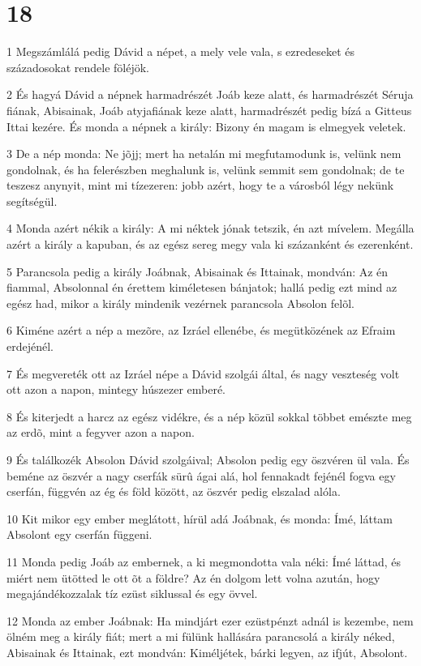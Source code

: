 \chapter{18}

\par 1 Megszámlálá pedig Dávid a népet, a mely vele vala, s ezredeseket és századosokat rendele föléjök.
\par 2 És hagyá Dávid a népnek harmadrészét Joáb keze alatt, és harmadrészét Séruja fiának,  Abisainak, Joáb atyjafiának keze alatt, harmadrészét pedig bízá a Gitteus Ittai kezére. És monda a népnek a király: Bizony én magam is elmegyek veletek.
\par 3 De a nép monda: Ne jõjj; mert ha netalán mi megfutamodunk is, velünk nem gondolnak, és ha felerészben meghalunk is, velünk semmit sem gondolnak; de te teszesz anynyit, mint mi tízezeren: jobb azért, hogy te a városból légy nekünk segítségül.
\par 4 Monda azért nékik a király: A mi néktek jónak tetszik, én azt mívelem. Megálla azért a király a kapuban, és az egész sereg megy vala ki százanként és ezerenként.
\par 5 Parancsola pedig a király Joábnak, Abisainak és Ittainak, mondván: Az én fiammal, Absolonnal én érettem kiméletesen bánjatok; hallá pedig ezt mind az egész had, mikor a király mindenik vezérnek parancsola Absolon felõl.
\par 6 Kiméne azért a nép a mezõre, az Izráel ellenébe, és megütközének az Efraim erdejénél.
\par 7 És megvereték ott az Izráel népe a Dávid szolgái által, és nagy veszteség volt ott azon a napon, mintegy húszezer emberé.
\par 8 És kiterjedt a harcz az egész vidékre, és a nép közül sokkal többet emészte meg az erdõ, mint a fegyver azon a napon.
\par 9 És találkozék Absolon Dávid szolgáival; Absolon pedig egy öszvéren ül vala. És beméne az öszvér a nagy cserfák sürû ágai alá, hol fennakadt fejénél fogva egy cserfán, függvén az ég és föld között, az öszvér pedig elszalad alóla.
\par 10 Kit mikor egy ember meglátott, hírül adá Joábnak, és monda: Ímé, láttam Absolont egy cserfán függeni.
\par 11 Monda pedig Joáb az embernek, a ki megmondotta vala néki: Ímé láttad, és miért nem ütötted le ott õt a földre? Az én dolgom lett volna azután, hogy megajándékozzalak tíz ezüst siklussal és egy övvel.
\par 12 Monda az ember Joábnak: Ha mindjárt ezer ezüstpénzt adnál is kezembe, nem ölném meg a király fiát; mert a mi fülünk hallására parancsolá a király néked, Abisainak és Ittainak, ezt mondván: Kiméljétek, bárki legyen, az ifjút, Absolont.

